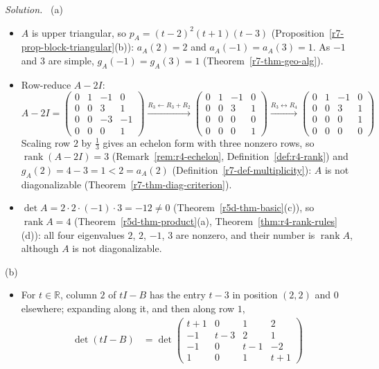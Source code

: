 \documentclass[12pt]{article}
\newcommand{\R}{\mathbb R}
\DeclareMathOperator{\rank}{rank}
\theoremstyle{definition}
\newenvironment{solution}{\par\noindent\textit{Solution.}\ }{\par\smallskip}
\begin{document}
\begin{solution}
(a)
\begin{itemize}
\item \(A\) is upper triangular, so \(p_A=(t-2)^2(t+1)(t-3)\) (Proposition~\ref{r7-prop-block-triangular}(b)):
\(a_A(2)=2\) and \(a_A(-1)=a_A(3)=1\). As \(-1\) and \(3\) are simple, \(g_A(-1)=g_A(3)=1\)
(Theorem~\ref{r7-thm-geo-alg}).
\item Row-reduce \(A-2I\):
\[
A-2I=\begin{pmatrix}0&1&-1&0\\0&0&3&1\\0&0&-3&-1\\0&0&0&1\end{pmatrix}
\xrightarrow{R_3\leftarrow R_3+R_2}
\begin{pmatrix}0&1&-1&0\\0&0&3&1\\0&0&0&0\\0&0&0&1\end{pmatrix}
\xrightarrow{R_3\leftrightarrow R_4}
\begin{pmatrix}0&1&-1&0\\0&0&3&1\\0&0&0&1\\0&0&0&0\end{pmatrix}
\]
Scaling row \(2\) by \(\frac13\) gives an echelon form with three nonzero rows, so \(\rank(A-2I)=3\)
(Remark~\ref{rem:r4-echelon}, Definition~\ref{def:r4-rank}) and \(g_A(2)=4-3=1<2=a_A(2)\)
(Definition~\ref{r7-def-multiplicity}): \(A\) is not diagonalizable (Theorem~\ref{r7-thm-diag-criterion}).
\item \(\det A=2\cdot2\cdot(-1)\cdot3=-12\ne0\) (Theorem~\ref{r5d-thm-basic}(c)), so \(\rank A=4\)
(Theorem~\ref{r5d-thm-product}(a), Theorem~\ref{thm:r4-rank-rules}(d)): all four eigenvalues \(2\), \(2\), \(-1\), \(3\)
are nonzero, and their number is \(\rank A\), although \(A\) is not diagonalizable.
\end{itemize}
(b)
\begin{itemize}
\item For \(t\in\R\), column \(2\) of \(tI-B\) has the entry \(t-3\) in position \((2,2)\) and \(0\) elsewhere; expanding
along it, and then along row \(1\),
\[
\begin{aligned}
\det(tI-B)&=\det\begin{pmatrix}t+1&0&1&2\\-1&t-3&2&1\\-1&0&t-1&-2\\1&0&1&t+1\end{pmatrix}

\end{aligned}\]
\end{itemize}
\end{solution}
\end{document}
